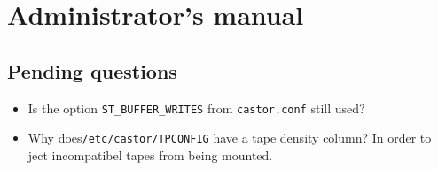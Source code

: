
\chapter{Administrator's manual}

\section{Pending questions}
\begin{itemize}
\item{}Is the option \verb#ST_BUFFER_WRITES# from \verb#castor.conf# still used?
\item{}Why does\verb#/etc/castor/TPCONFIG# have a tape density column? In order to ject incompatibel tapes from being mounted.
\end{itemize}

